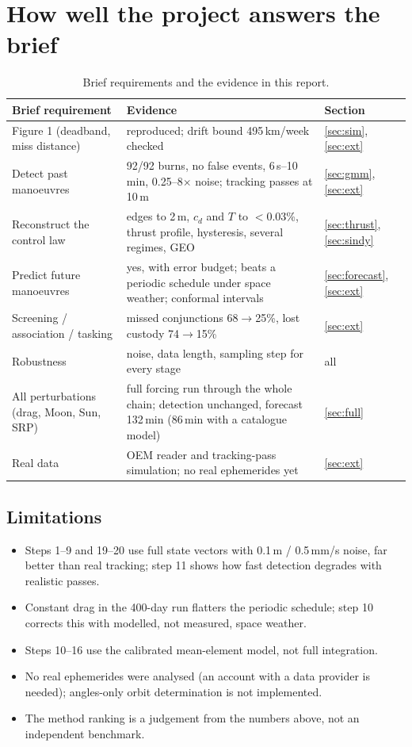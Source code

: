 \documentclass[11pt,a4paper]{article}
\begin{document}
\section{How well the project answers the brief}\label{sec:brief}
\begin{table}[H]\centering\small
\caption{Brief requirements and the evidence in this report.}\label{tab:brief}
\begin{tabularx}{\textwidth}{lXl}
\toprule
Brief requirement & Evidence & Section\\\midrule
Figure 1 (deadband, miss distance) & reproduced; drift bound 495\,km/week checked & \ref{sec:sim}, \ref{sec:ext}\\
Detect past manoeuvres & 92/92 burns, no false events, 6\,s--10\,min, 0.25--8$\times$ noise; tracking passes at 10\,m & \ref{sec:gmm}, \ref{sec:ext}\\
Reconstruct the control law & edges to 2\,m, $c_d$ and $T$ to $<$0.03\%, thrust profile, hysteresis, several regimes, GEO & \ref{sec:thrust}, \ref{sec:sindy}\\
Predict future manoeuvres & yes, with error budget; beats a periodic schedule under space weather; conformal intervals & \ref{sec:forecast}, \ref{sec:ext}\\
Screening / association / tasking & missed conjunctions 68$\to$25\%, lost custody 74$\to$15\% & \ref{sec:ext}\\
Robustness & noise, data length, sampling step for every stage & all\\
All perturbations (drag, Moon, Sun, SRP) & full forcing run through the whole chain; detection unchanged,
forecast 132\,min (86\,min with a catalogue model) & \ref{sec:full}\\
Real data & OEM reader and tracking-pass simulation; no real ephemerides yet & \ref{sec:ext}\\
\bottomrule
\end{tabularx}
\end{table}

\subsection{Limitations}
\begin{itemize}
  \item Steps 1--9 and 19--20 use full state vectors with 0.1\,m / 0.5\,mm/s noise, far better than real tracking; step 11
        shows how fast detection degrades with realistic passes.
  \item Constant drag in the 400-day run flatters the periodic schedule; step 10 corrects this with modelled, not
        measured, space weather.
  \item Steps 10--16 use the calibrated mean-element model, not full integration.
  \item No real ephemerides were analysed (an account with a data provider is needed); angles-only orbit determination
        is not implemented.
  \item The method ranking is a judgement from the numbers above, not an independent benchmark.
\end{itemize}
\end{document}
